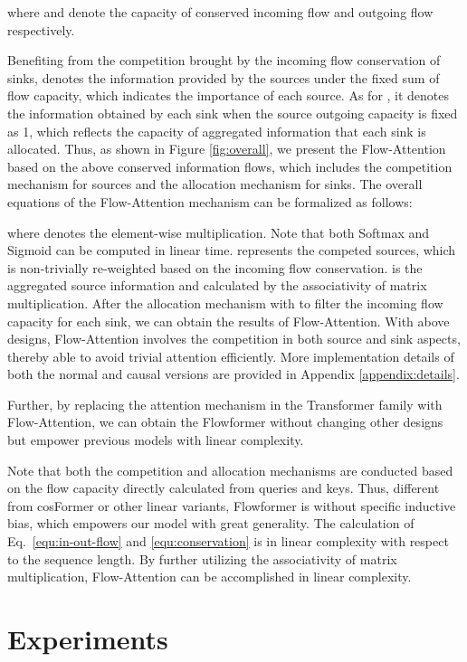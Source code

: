 \documentclass[nohyperref]{article}
\theoremstyle{plain}
\theoremstyle{definition}
\theoremstyle{remark}
\begin{document}
where  and  denote the capacity of conserved incoming flow and outgoing flow respectively. 

Benefiting from the competition brought by the incoming flow conservation of sinks,  denotes the information provided by the sources under the fixed sum of flow capacity, which indicates the importance of each source. As for , it denotes the information obtained by each sink when the source outgoing capacity is fixed as 1, which reflects the capacity of aggregated information that each sink is allocated. Thus, as shown in Figure \ref{fig:overall}, we present the Flow-Attention based on the above conserved information flows, which includes the competition mechanism for sources and the allocation mechanism for sinks. The overall equations of the Flow-Attention mechanism can be formalized as follows:

where  denotes the element-wise multiplication. Note that both Softmax and Sigmoid can be computed in linear time.  represents the competed sources, which is non-trivially re-weighted based on the incoming flow conservation.  is the aggregated source information and calculated by the associativity of matrix multiplication. After the allocation mechanism with  to filter the incoming flow capacity for each sink, we can obtain the results  of Flow-Attention. With above designs, Flow-Attention involves the competition in both source and sink aspects, thereby able to avoid trivial attention efficiently. More implementation details of both the normal and causal versions are provided in Appendix \ref{appendix:details}.

Further, by replacing the attention mechanism in the Transformer family \cite{NIPS2017_3f5ee243} with Flow-Attention, we can obtain the Flowformer without changing other designs but empower previous models with linear complexity.

Note that both the competition and allocation mechanisms are conducted based on the flow capacity directly calculated from queries and keys. Thus, different from cosFormer \cite{anonymous2022cosformer} or other linear variants, Flowformer is without specific inductive bias, which empowers our model with great generality. The calculation of Eq.~\eqref{equ:in-out-flow} and \eqref{equ:conservation} is in linear complexity with respect to the sequence length. By further utilizing the associativity of matrix multiplication, Flow-Attention can be accomplished in linear complexity. 


\vspace{-5pt}
\section{Experiments}
\end{document}
